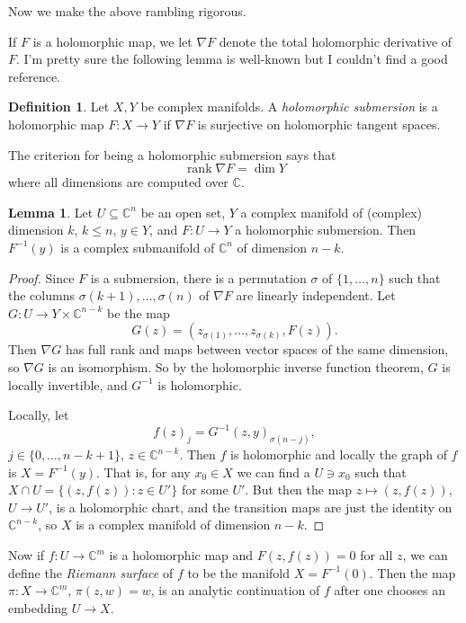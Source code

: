 \documentclass[12pt]{report}
\newcommand{\CC}{\mathbb{C}}
\DeclareMathOperator{\rank}{rank}
\newcommand{\dfn}[1]{\emph{#1}\index{#1}}
\theoremstyle{definition}
\newtheorem{lemma}[theorem]{Lemma}
\newtheorem{definition}[theorem]{Definition}
\begin{document}
Now we make the above rambling rigorous.

If $F$ is a holomorphic map, we let $\nabla F$ denote the total holomorphic derivative of $F$.
I'm pretty sure the following lemma is well-known but I couldn't find a good reference.
\begin{definition}
Let $X,Y$ be complex manifolds.
A \dfn{holomorphic submersion} is a holomorphic map $F: X \to Y$ if $\nabla F$ is surjective on holomorphic tangent spaces.
\end{definition}
The criterion for being a holomorphic submersion says that
$$\rank \nabla F = \dim Y$$
where all dimensions are computed over $\CC$.
\begin{lemma}
Let $U \subseteq \CC^n$ be an open set, $Y$ a complex manifold of (complex) dimension $k$, $k \leq n$, $y \in Y$, and $F: U \to Y$ a holomorphic submersion.
Then $F^{-1}(y)$ is a complex submanifold of $\CC^n$ of dimension $n - k$.
\end{lemma}
\begin{proof}
Since $F$ is a submersion, there is a permutation $\sigma$ of $\{1, \dots, n\}$ such that the columns $\sigma(k+1), \dots, \sigma(n)$ of $\nabla F$ are linearly independent.
Let $G: U \to Y \times \CC^{n - k}$ be the map
$$G(z) = (z_{\sigma(1)}, \dots, z_{\sigma(k)}, F(z)).$$
Then $\nabla G$ has full rank and maps between vector spaces of the same dimension, so $\nabla G$ is an isomorphism.
So by the holomorphic inverse function theorem, $G$ is locally invertible, and $G^{-1}$ is holomorphic.

Locally, let
$$f(z)_j = G^{-1}(z, y)_{\sigma(n-j)},$$
$j \in \{0, \dots, n - k + 1\}$, $z \in \CC^{n - k}$.
Then $f$ is holomorphic and locally the graph of $f$ is $X = F^{-1}(y)$.
That is, for any $x_0 \in X$ we can find a $U \ni x_0$ such that $X \cap U = \{(z, f(z)): z \in U'\}$ for some $U'$.
But then the map $z \mapsto (z, f(z))$, $U \to U'$, is a holomorphic chart, and the transition maps are just the identity on $\CC^{n-k}$, so $X$ is a complex manifold of dimension $n - k$.
\end{proof}
Now if $f: U \to \CC^m$ is a holomorphic map and $F(z, f(z)) = 0$ for all $z$, we can define the \emph{Riemann surface} of $f$ to be the manifold $X = F^{-1}(0)$. Then the map $\pi: X \to \CC^m$, $\pi(z, w) = w$, is an analytic continuation of $f$ after one chooses an embedding $U \to X$.
\end{document}
